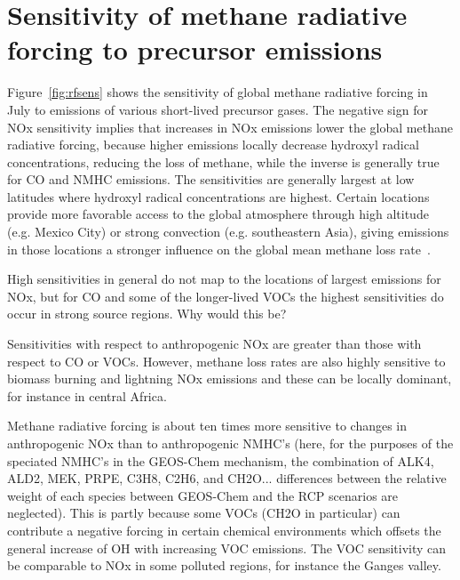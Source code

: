 \section{Sensitivity of methane radiative forcing to precursor emissions}

Figure~\ref{fig:rfsens} shows the sensitivity of global methane radiative forcing in July to emissions of various short-lived precursor gases. The negative sign for NOx sensitivity implies that increases in NOx emissions lower the global methane radiative forcing, because higher emissions locally decrease hydroxyl radical concentrations, reducing the loss of methane, while the inverse is generally true for CO and NMHC emissions. The sensitivities are generally largest at low latitudes where hydroxyl radical concentrations are highest. Certain locations provide more favorable access to the global atmosphere through high altitude (e.g. Mexico City) or strong convection (e.g. southeastern Asia), giving emissions in those locations a stronger influence on the global mean methane loss rate~\citep{ref:bowman2012}.

High sensitivities in general do not map to the locations of largest emissions for NOx, but for CO and some of the longer-lived VOCs the highest sensitivities do occur in strong source regions. Why would this be?

Sensitivities with respect to anthropogenic NOx are greater than those with respect to CO or VOCs. However, methane loss rates are also highly sensitive to biomass burning and lightning NOx emissions and these can be locally dominant, for instance in central Africa.

Methane radiative forcing is about ten times more sensitive to changes in anthropogenic NOx than to anthropogenic NMHC's (here, for the purposes of the speciated NMHC's in the GEOS-Chem mechanism, the combination of ALK4, ALD2, MEK, PRPE, C3H8, C2H6, and CH2O... differences between the relative weight of each species between GEOS-Chem and the RCP scenarios are neglected). This is partly because some VOCs (CH2O in particular) can contribute a negative forcing in certain chemical environments which offsets the general increase of OH with increasing VOC emissions. The VOC sensitivity can be comparable to NOx in some polluted regions, for instance the Ganges valley.

